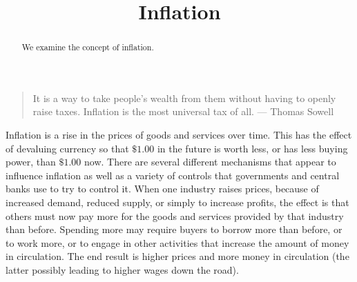 \documentclass{ximera}
\title{Inflation}
\begin{document}
\begin{abstract}
We examine the concept of inflation.
\end{abstract}
\maketitle

\begin{quote}
It is a way to take people's wealth from them without having to openly raise taxes. Inflation is the most universal tax of all. --- Thomas Sowell
\end{quote}

Inflation is a rise in the prices of goods and services over time. This has the effect of devaluing currency so that $\$1.00$ in the future is worth less, or has less buying power, than $\$1.00$ now. There are several different mechanisms that appear to influence inflation as well as a variety of controls that governments and central banks use to try to control it. When one industry raises prices, because of increased demand, reduced supply, or simply to increase profits, the effect is that others must now pay more for the goods and services provided by that industry than before. Spending more may require buyers to borrow more than before, or to work more, or to engage in other activities that increase the amount of money in circulation. The end result is higher prices and more money in circulation (the latter possibly leading to higher wages down the road).
\end{document}

